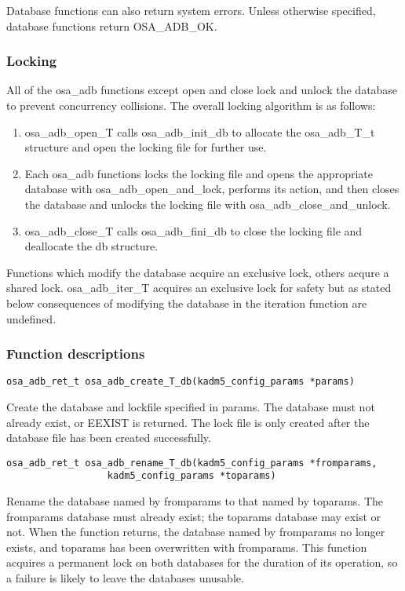 Database functions can also return system errors.  Unless otherwise
specified, database functions return OSA_ADB_OK.

\subsubsection{Locking}

All of the osa_adb functions except open and close lock and unlock the
database to prevent concurrency collisions.  The overall locking
algorithm is as follows:

\begin{enumerate}
\item osa_adb_open_T calls osa_adb_init_db to allocate the osa_adb_T_t
structure and open the locking file for further use.

\item Each osa_adb functions locks the locking file and opens the
appropriate database with osa_adb_open_and_lock, performs its action,
and then closes the database and unlocks the locking file with
osa_adb_close_and_unlock.

\item osa_adb_close_T calls osa_adb_fini_db to close the locking file
and deallocate the db structure.
\end{enumerate}

Functions which modify the database acquire an exclusive lock, others
acqure a shared lock.  osa_adb_iter_T acquires an exclusive lock for
safety but as stated below consequences of modifying the database in
the iteration function are undefined.

\subsubsection{Function descriptions}

\begin{verbatim}
osa_adb_ret_t osa_adb_create_T_db(kadm5_config_params *params)
\end{verbatim}
%
Create the database and lockfile specified in params.  The database
must not already exist, or EEXIST is returned.  The lock file is only
created after the database file has been created successfully.

\begin{verbatim}
osa_adb_ret_t osa_adb_rename_T_db(kadm5_config_params *fromparams,
				  kadm5_config_params *toparams)
\end{verbatim}
%
Rename the database named by fromparams to that named by toparams.
The fromparams database must already exist; the toparams database may
exist or not.  When the function returns, the database named by
fromparams no longer exists, and toparams has been overwritten with
fromparams.  This function acquires a permanent lock on both databases
for the duration of its operation, so a failure is likely to leave the
databases unusable.

